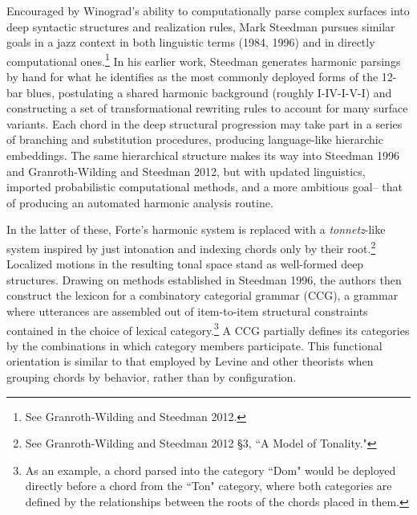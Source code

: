 Encouraged by Winograd's ability to computationally parse complex surfaces into deep syntactic structures and realization rules, Mark Steedman pursues similar goals in a jazz context in both linguistic terms (1984, 1996) and in directly computational ones.\footnote{See Granroth-Wilding and Steedman 2012.}  In his earlier work, Steedman generates harmonic parsings by hand for what he identifies as the most commonly deployed forms of the 12-bar blues, postulating a shared harmonic background (roughly I-IV-I-V-I) and constructing a set of transformational rewriting rules to account for many surface variants.  Each chord in the deep structural progression may take part in a series of branching and substitution procedures, producing language-like hierarchic embeddings. The same hierarchical structure makes its way into Steedman 1996 and Granroth-Wilding and Steedman 2012, but with updated linguistics, imported probabilistic computational methods, and a more ambitious goal-- that of producing an automated harmonic analysis routine.

In the latter of these, Forte's harmonic system is replaced with a \emph{tonnetz}-like system inspired by just intonation and indexing chords only by their root.\footnote{See Granroth-Wilding and Steedman 2012 \S 3, ``A Model of Tonality."}  Localized motions in the resulting tonal space stand as well-formed deep structures.  Drawing on methods established in Steedman 1996, the authors then construct the lexicon for a combinatory categorial grammar (CCG), a grammar where utterances are assembled out of item-to-item structural constraints contained in the choice of lexical category.\footnote{As an example, a chord parsed into the category ``Dom" would be deployed directly before a chord from the ``Ton" category, where both categories are defined by the relationships between the roots of the chords placed in them.}  A CCG partially defines its categories by the combinations in which category members participate.  This functional orientation is similar to that employed by Levine and other theorists when grouping chords by behavior, rather than by configuration.

